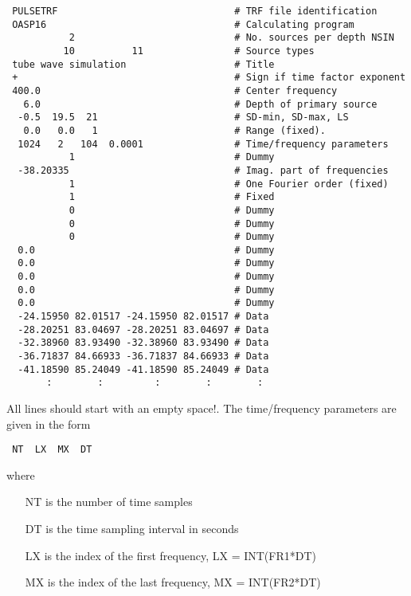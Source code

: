 \small
\begin{verbatim}
 PULSETRF                               # TRF file identification
 OASP16                                 # Calculating program
           2                            # No. sources per depth NSIN
          10          11                # Source types
 tube wave simulation                   # Title
 +                                      # Sign if time factor exponent
 400.0                                  # Center frequency 
   6.0                                  # Depth of primary source
  -0.5  19.5  21                        # SD-min, SD-max, LS
   0.0   0.0   1                        # Range (fixed).
  1024   2   104  0.0001                # Time/frequency parameters
           1                            # Dummy
  -38.20335                             # Imag. part of frequencies
           1                            # One Fourier order (fixed)
           1                            # Fixed
           0                            # Dummy
           0                            # Dummy
           0                            # Dummy
  0.0                                   # Dummy
  0.0                                   # Dummy
  0.0                                   # Dummy
  0.0                                   # Dummy
  0.0                                   # Dummy
  -24.15950 82.01517 -24.15950 82.01517 # Data
  -28.20251 83.04697 -28.20251 83.04697 # Data
  -32.38960 83.93490 -32.38960 83.93490 # Data
  -36.71837 84.66933 -36.71837 84.66933 # Data
  -41.18590 85.24049 -41.18590 85.24049 # Data
       :        :         :        :        :
\end{verbatim}
\normalsize

 All lines should start with an empty space!.
 The time/frequency parameters are given in the form

\small
\begin{verbatim}
 NT  LX  MX  DT
\end{verbatim}
\normalsize
\noindent where
\begin{itemize}
\item[NT] is the number of time samples
\item[DT] is the time sampling interval in seconds
\item[LX] is the index of the first frequency, LX = INT(FR1*DT)
\item[MX] is the index of the last frequency, MX = INT(FR2*DT)
\end{itemize}

